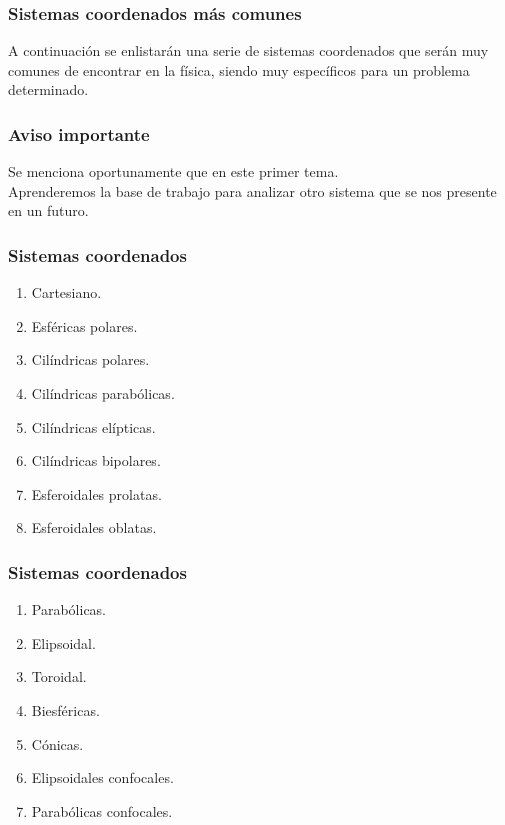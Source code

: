 \documentclass[12pt]{beamer}
\begin{document}
\begin{frame}
\frametitle{Sistemas coordenados más comunes}
A continuación se enlistarán una serie de sistemas coordenados que serán muy comunes de encontrar en la física, siendo muy específicos para un problema determinado.
\end{frame}
\begin{frame}
\frametitle{Aviso importante}
Se menciona oportunamente que  en este primer tema.
\\
\bigskip
\pause
Aprenderemos la base de trabajo para analizar otro sistema que se nos presente en un futuro.
\end{frame}
\begin{frame}
\frametitle{Sistemas coordenados}
\begin{enumerate}[<+->]
\item Cartesiano.
\item Esféricas polares.
\item Cilíndricas polares.
\item Cilíndricas parabólicas.
\item Cilíndricas elípticas.
\item Cilíndricas bipolares.
\item Esferoidales prolatas.
\item Esferoidales oblatas.
\seti
\end{enumerate}
\end{frame}
\begin{frame}
\frametitle{Sistemas coordenados}
\begin{enumerate}[<+->]
\conti
\item Parabólicas.
\item Elipsoidal.
\item Toroidal.
\item Biesféricas.
\item Cónicas.
\item Elipsoidales confocales.
\item Parabólicas confocales.
\end{enumerate}
\end{frame}
\end{document}
